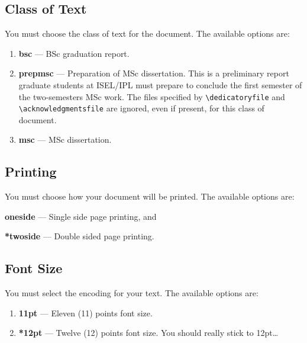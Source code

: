 \subsection{Class of Text} %
\label{sub:class_of_text}

You must choose the class of text for the document. The available options are:

\begin{enumerate}
	\item \textbf{bsc} --- BSc graduation report.
	\item \textbf{prepmsc} --- Preparation of MSc dissertation. This is a preliminary report graduate students at ISEL/IPL must prepare to conclude the first semester of the two-semesters MSc work. The files specified by \verb!\dedicatoryfile! and \verb!\acknowledgmentsfile! are ignored, even if present, for this class of document.
	\item \textbf{msc} --- MSc dissertation.
\end{enumerate}
%
\subsection{Printing} %
\label{sub:printing}

You must choose how your document will be printed. The available options are:

\begin{inparaenum}[(i)]
\item \textbf{oneside} --- Single side page printing, and
\item \textbf{*twoside} --- Double sided page printing.
\end{inparaenum}


\subsection{Font Size} %
\label{ssec:font_size}

You must select the encoding for your text. The available options are:
\begin{enumerate}
	\item \textbf{11pt} --- Eleven (11) points font size.
	\item \textbf{*12pt} --- Twelve (12) points font size. You should really stick to 12pt\ldots
\end{enumerate}


